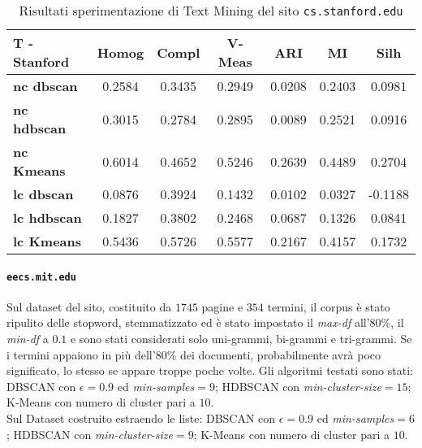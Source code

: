 \begin{table}[H]
	\begin{tabular}{| l | c | c | c | c | c | c |}
	\hline
	\textbf{T - Stanford}  & \textbf{Homog} & \textbf{Compl} & \textbf{V-Meas}  & \textbf{ARI}  & \textbf{MI}  & \textbf{Silh} \\ [3ex] \hline
	\textbf{nc dbscan} & 0.2584 & 0.3435 & 0.2949 & 0.0208 & 0.2403 & 0.0981\\ [3ex]
	 \hline 
	\textbf{nc hdbscan} & 0.3015 & 0.2784 & 0.2895 & 0.0089 & 0.2521 & 0.0916\\ [3ex]
	 \hline
	\textbf{nc Kmeans} & 0.6014 & 0.4652 & 0.5246 & 0.2639 & 0.4489 & 0.2704\\ [3ex]
	 \hline	
	\textbf{lc dbscan} & 0.0876 & 0.3924 & 0.1432 & 0.0102 & 0.0327 & -0.1188\\ [3ex]
	\hline
	\textbf{lc hdbscan} & 0.1827 & 0.3802 & 0.2468 & 0.0687 & 0.1326 & 0.0841\\ [3ex]
	\hline
	\textbf{lc Kmeans} & 0.5436 & 0.5726 & 0.5577 & 0.2167 & 0.4157 & 0.1732\\ [3ex]
	\hline
	\end{tabular}
	\caption{Risultati sperimentazione di Text Mining del sito \texttt{cs.stanford.edu}}
	\label{metricheTextStanf}
\end{table}

\paragraph{\texttt{eecs.mit.edu}}
Sul dataset del sito, costituito da $1745$ pagine e $354$ termini, il corpus è stato ripulito delle stopword, stemmatizzato ed è stato impostato il \textit{max-df} all'80\%, il \textit{min-df} a $0.1$ e sono stati considerati solo uni-grammi, bi-grammi e tri-grammi. Se i termini appaiono in più dell'80\% dei documenti, probabilmente avrà poco significato, lo stesso se appare troppe poche volte. Gli algoritmi testati sono stati: DBSCAN con $\epsilon = 0.9$ ed \textit{min-samples}$ = 9$; HDBSCAN con \textit{min-cluster-size}$=15$; K-Means con numero di cluster pari a $10$. \\Sul Dataset costruito estraendo le liste: DBSCAN con $\epsilon = 0.9$ ed \textit{min-samples}$ = 6$; HDBSCAN con \textit{min-cluster-size}$=9$; K-Means con numero di cluster pari a $10$. 

